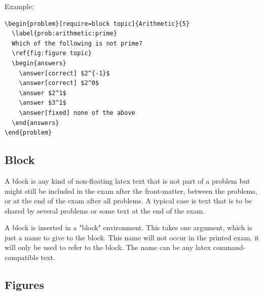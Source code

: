 \documentclass{article}
\begin{document}
Example:
\begin{verbatim}
\begin{problem}[require=block topic]{Arithmetic}{5}
  \label{prob:arithmetic:prime}
  Which of the following is not prime?
  \ref{fig:figure topic}
  \begin{answers}
    \answer[correct] $2^{-1}$
    \answer[correct] $2^0$
    \answer $2^1$
    \answer $3^1$
    \answer[fixed] none of the above
  \end{answers}
\end{problem}
\end{verbatim}

\subsection{Block}
A block is any kind of non-floating latex text that is not part of a problem but might still be included in the exam after the front-matter, between the problems, or at the end of the exam after all problems. A typical case is text that is to be shared by several problems or some text at the end of the exam.

A block is inserted in a "block" environment. This takes one argument, which is just a name to give to the block. This name will not occur in the printed exam, it will only be used to refer to the block. The name can be any latex command-compatible text.

\subsection{Figures}

\end{document}
